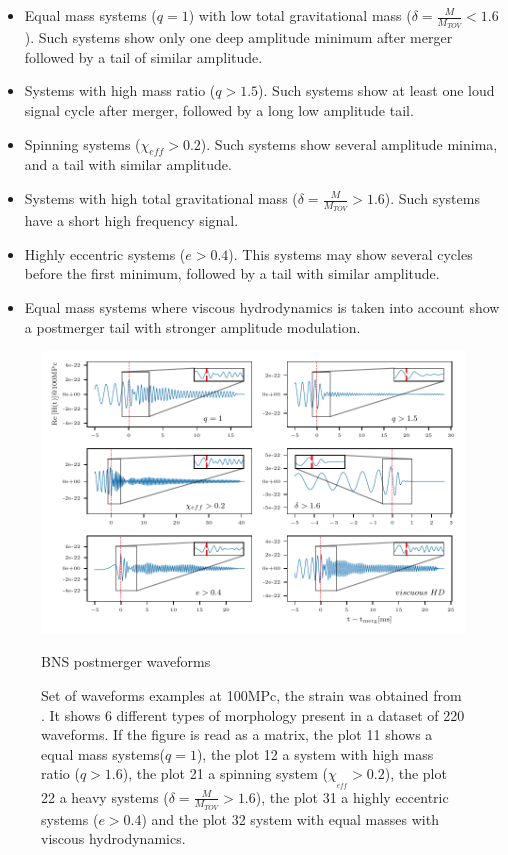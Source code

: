 \begin{itemize}
\item Equal mass systems ($q=1$) with low total gravitational mass ($\delta=\frac{M}{M_{TOV}}<1.6$). Such systems show only one deep amplitude minimum after merger followed by a tail of similar amplitude.

\item Systems with high mass ratio ($q>1.5$). Such systems show at least one loud signal cycle after merger, followed by a long low amplitude tail.

\item Spinning systems ($\chi_{eff}>0.2$). Such systems show several amplitude minima, and a tail with similar amplitude.

\item Systems with high total gravitational mass ($\delta=\frac{M}{M_{TOV}}>1.6$). Such systems have a short high frequency signal.

\item Highly eccentric systems ($e>0.4$). This systems may show several cycles before the first minimum, followed by a tail with similar amplitude.

\item Equal mass systems where viscous hydrodynamics is taken into account show a postmerger tail with stronger amplitude modulation.

\end{itemize}


\begin{figure}[hbt!]
\begin{center}
\includegraphics[width=\textwidth, angle=0]{images/Data_analysis/results/postm_wf_grid.pdf}
\captionsetup{width=0.8\textwidth}
\caption{BNS postmerger waveforms}
\caption*{Set of waveforms examples at 100MPc, the strain was obtained from \cite{}. It shows 6 different types of morphology present in a dataset of 220 waveforms. If the figure is read as a matrix, the plot 11 shows a equal mass systems($q=1$), the plot 12 a system with high mass ratio ($q>1.6$), the plot 21 a spinning system ($\chi_{_{eff}}>0.2$), the plot 22 a heavy systems ($\delta=\frac{M}{M_{TOV}}>1.6$), the plot 31 a highly eccentric systems ($e>0.4$) and the plot 32 system with equal masses with viscous hydrodynamics.}
\end{center}
\label{fig:10}
\end{figure}

